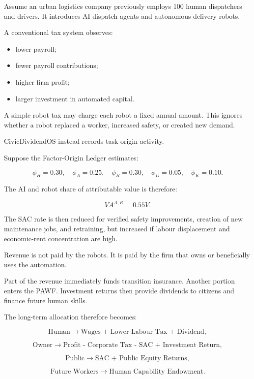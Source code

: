 \documentclass[conference]{IEEEtran}
\begin{document}
Assume an urban logistics company previously employs 100 human dispatchers and
drivers. It introduces AI dispatch agents and autonomous delivery robots.

A conventional tax system observes:

\begin{itemize}
\item lower payroll;
\item fewer payroll contributions;
\item higher firm profit;
\item larger investment in automated capital.
\end{itemize}

A simple robot tax may charge each robot a fixed annual amount. This ignores
whether a robot replaced a worker, increased safety, or created new demand.

CivicDividendOS instead records task-origin activity.

Suppose the Factor-Origin Ledger estimates:

\[
\phi_H=0.30,\quad
\phi_A=0.25,\quad
\phi_R=0.30,\quad
\phi_D=0.05,\quad
\phi_K=0.10.
\]

The AI and robot share of attributable value is therefore:

\begin{equation}
VA^{A,R}=0.55V.
\end{equation}

The SAC rate is then reduced for verified safety improvements, creation of new
maintenance jobs, and retraining, but increased if labour displacement and
economic-rent concentration are high.

Revenue is not paid by the robots. It is paid by the firm that owns or
beneficially uses the automation.

Part of the revenue immediately funds transition insurance. Another portion
enters the PAWF. Investment returns then provide dividends to citizens and
finance future human skills.

The long-term allocation therefore becomes:

\[
\text{Human} \rightarrow
\text{Wages + Lower Labour Tax + Dividend},
\]

\[
\text{Owner} \rightarrow
\text{Profit - Corporate Tax - SAC + Investment Return},
\]

\[
\text{Public} \rightarrow
\text{SAC + Public Equity Returns},
\]

\[
\text{Future Workers} \rightarrow
\text{Human Capability Endowment}.
\]
\end{document}
